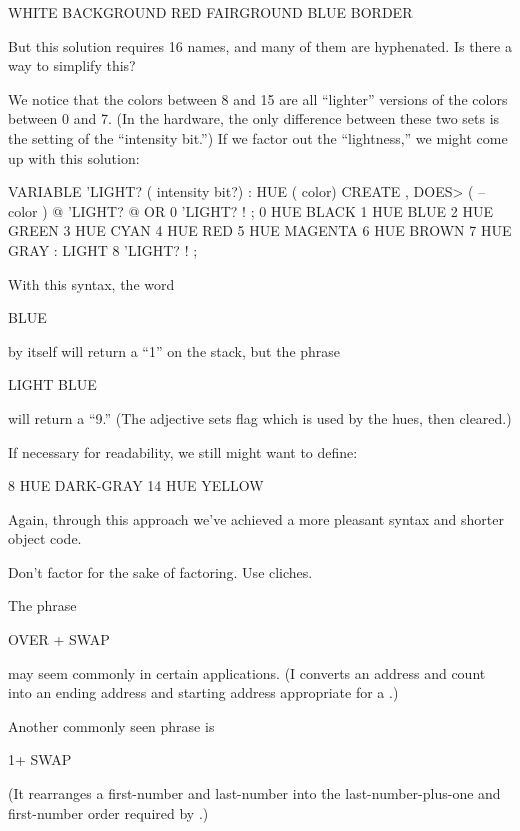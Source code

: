 \begin{Code}
WHITE BACKGROUND  RED FAIRGROUND  BLUE BORDER
\end{Code}
But this solution requires 16 names, and many of them are hyphenated.
Is there a way to simplify this?

We notice that the colors between 8 and 15 are all ``lighter''
versions of the colors between 0 and 7. (In the hardware, the only
difference between these two sets is the setting of the ``intensity
bit.'') If we factor out the ``lightness,'' we might come up with this
solution:

\begin{Code}
VARIABLE 'LIGHT?  ( intensity bit?)
: HUE  ( color)  CREATE ,
   DOES>  ( -- color )  @  'LIGHT? @  OR  0 'LIGHT? ! ;
 0 HUE BLACK         1 HUE BLUE           2 HUE GREEN
 3 HUE CYAN          4 HUE RED            5 HUE MAGENTA
 6 HUE BROWN         7 HUE GRAY
: LIGHT   8 'LIGHT? ! ;
\end{Code}
With this syntax, the word

\begin{Code}
BLUE
\end{Code}
by itself will return a ``1'' on the stack, but the phrase

\begin{Code}
LIGHT BLUE
\end{Code}
will return a ``9.'' (The adjective  sets flag which is
used by the hues, then cleared.)

\goodbreak
If necessary for readability, we still might want to define:

\begin{Code}
8 HUE DARK-GRAY
14 HUE YELLOW
\end{Code}
Again, through this approach we've achieved a more pleasant syntax and
shorter object code.

\begin{tip}
Don't factor for the sake of factoring. Use cliches.
\end{tip}
The phrase

\begin{Code}
OVER + SWAP
\end{Code}
may seem commonly in certain applications. (I converts an address and
count into an ending address and starting address appropriate for a
.)

Another commonly seen phrase is

\begin{Code}
1+ SWAP
\end{Code}
(It rearranges a first-number and last-number into the
last-number-plus-one and first-number order required by .)

